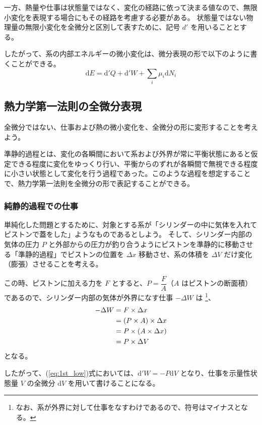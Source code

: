 \documentclass[uplatex,dvipdfmx,a4paper,11pt]{jsarticle}
\newcommand{\diff}{\mathrm d}
\begin{document}
一方、熱量や仕事は状態量ではなく、変化の経路に依って決まる値なので、無限小変化を表現する場合にもその経路を考慮する必要がある。
状態量ではない物理量の無限小変化を全微分と区別して表すために、記号 $d'$ を用いることとする。

したがって、系の内部エネルギーの微小変化は、微分表現の形で以下のように書くことができる。
\begin{equation}
\diff E = \diff' Q + \diff' W + \sum_i \mu_i \diff N_i
\label{eq:1st_low}
\end{equation}


\subsection{熱力学第一法則の全微分表現}
全微分ではない、仕事および熱の微小変化を、全微分の形に変形することを考えよう。

準静的過程とは、変化の各瞬間において系および外界が常に平衡状態にあると仮定できる程度に変化をゆっくり行い、平衡からのずれが各瞬間で無視できる程度に小さい状態として変化を行う過程であった。このような過程を想定することで、熱力学第一法則を全微分の形で表記することができる。

\subsubsection{純静的過程での仕事}
単純化した問題とするために、対象とする系が「シリンダーの中に気体を入れてピストンで蓋をした」ようなものであるとしよう。
そして、シリンダー内部の気体の圧力 $P$ と外部からの圧力が釣り合うようにピストンを準静的に移動させる「準静的過程」でピストンの位置を $\Delta x$ 移動させ、系の体積を $\Delta V$ だけ変化（膨張）させることを考える。

この時、ピストンに加える力を $F$ とすると、$P = \dfrac{F}{A}$（$A$ はピストンの断面積）であるので、シリンダー内部の気体が外界になす仕事 $- \Delta W$ は
\footnote
{
なお、系が外界に対して仕事をなすわけであるので、符号はマイナスとなる。
}、
\begin{align}
	-\Delta W 
		&= F \times \Delta x \notag \\
		&= (P \times A) \times \Delta x \notag \\
		&= P \times (A \times \Delta x) \notag \\
		&= P \times \Delta V
\end{align}
となる。


したがって、(\ref{eq:1st_low})式においては、$\diff' W = -P \diff V$ となり、仕事を示量性状態量 $V$ の全微分 $\diff V$ を用いて書けることになる。
\end{document}
